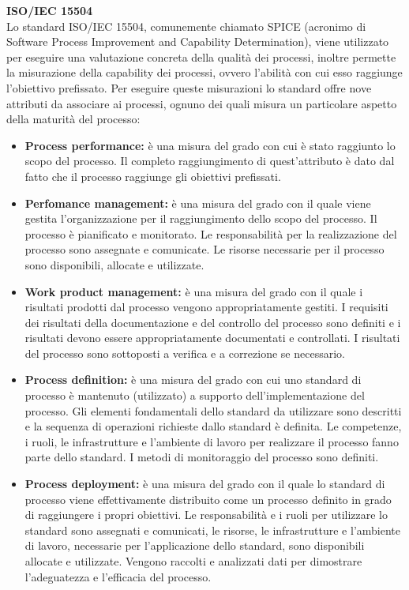 \documentclass[11pt,a4paper]{article}
\begin{document}
{\textbf{ISO/IEC 15504} \\
Lo standard ISO/IEC 15504, comunemente chiamato SPICE (acronimo di Software Process Improvement and Capability Determination), viene utilizzato per eseguire una valutazione concreta della qualità dei processi, inoltre permette la misurazione della capability dei processi, ovvero l'abilità con cui esso raggiunge l'obiettivo prefissato. Per eseguire queste misurazioni lo standard offre nove attributi da associare ai processi, ognuno dei quali misura un particolare aspetto della maturità del processo:
\begin{itemize}
	\item \textbf{Process performance:} è una misura del grado con cui è stato raggiunto lo scopo del processo. Il completo raggiungimento di quest'attributo è dato dal fatto che il processo raggiunge gli obiettivi prefissati.
	\item \textbf{Perfomance management:} è una misura del grado con il quale viene gestita l'organizzazione per il raggiungimento dello scopo del processo. Il processo è pianificato e monitorato. Le responsabilità per la realizzazione del processo sono assegnate e comunicate. Le risorse necessarie per il processo sono disponibili, allocate e utilizzate. 
	\item \textbf{Work product management:} è una misura del grado con il quale i risultati prodotti dal processo vengono appropriatamente gestiti. I requisiti dei risultati della documentazione e del controllo del processo sono definiti e i risultati devono essere appropriatamente documentati e controllati. I risultati del processo sono sottoposti a verifica e a correzione se necessario.
	\item \textbf{Process definition:} è una misura del grado con cui uno standard di processo è mantenuto (utilizzato) a supporto dell'implementazione del processo. Gli elementi fondamentali dello standard da utilizzare sono descritti e la sequenza di operazioni richieste dallo standard è definita. Le competenze, i ruoli, le infrastrutture e l'ambiente di lavoro per realizzare il processo fanno parte dello standard. I metodi di monitoraggio del processo sono definiti.
	\item \textbf{Process deployment:} è una misura del grado con il quale lo standard di processo viene effettivamente distribuito come un processo definito in grado di raggiungere i propri obiettivi. Le responsabilità e i ruoli per utilizzare lo standard sono assegnati e comunicati, le risorse, le infrastrutture e l'ambiente di lavoro, necessarie per l'applicazione dello standard, sono disponibili allocate e utilizzate. Vengono raccolti e analizzati dati per dimostrare l'adeguatezza e l'efficacia del processo.

\end{itemize}}
\end{document}
